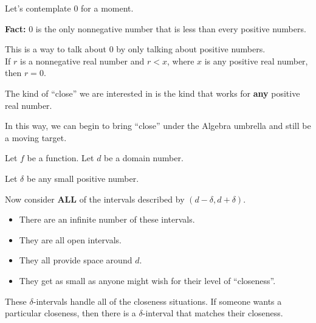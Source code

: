 \documentclass{ximera}
\begin{document}
Let's contemplate $0$ for a moment. \\

\begin{fact}


\textbf{Fact:} $0$ is the only nonnegative number that is less than every positive numbers.


\end{fact}

This is a way to talk about $0$ by only talking about positive numbers. \\



If $r$ is a nonnegative real number and $r < x$, where $x$ is any positive real number, then $r = 0$.







\begin{idea}


The kind of ``close'' we are interested in is the kind that works for \textbf{\textcolor{purple!85!blue}{any}} positive real number.


\end{idea}






In this way, we can begin to bring ``close'' under the Algebra umbrella and still be a moving target.


Let $f$ be a function. Let $d$ be a domain number.

Let $\delta$ be any small positive number.

Now consider \textbf{\textcolor{red!80!black}{ALL}} of the intervals described by $(d - \delta, d + \delta)$.


\begin{itemize}
\item There are an infinite number of these intervals.
\item They are all open intervals.
\item They all provide space around $d$.
\item They get as small as anyone might wish for their level of ``closeness''.
\end{itemize}

These $\delta$-intervals handle all of the closeness situations.  If someone wants a particular closeness, then there is a $\delta$-interval that matches their closeness.
\end{document}
